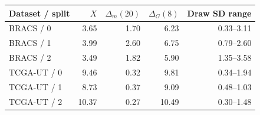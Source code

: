 \begin{tabular}{@{}lrrrr@{}}
\toprule
Dataset / split & $X$ & $\Delta_m(20)$ & $\Delta_G(8)$ & Draw SD range \\
\midrule
BRACS / 0 & 3.65 & 1.70 & 6.23 & 0.33--3.11 \\
BRACS / 1 & 3.99 & 2.60 & 6.75 & 0.79--2.60 \\
BRACS / 2 & 3.49 & 1.82 & 5.90 & 1.35--3.58 \\
TCGA-UT / 0 & 9.46 & 0.32 & 9.81 & 0.34--1.94 \\
TCGA-UT / 1 & 8.73 & 0.37 & 9.09 & 0.48--1.03 \\
TCGA-UT / 2 & 10.37 & 0.27 & 10.49 & 0.30--1.48 \\
\bottomrule
\end{tabular}
